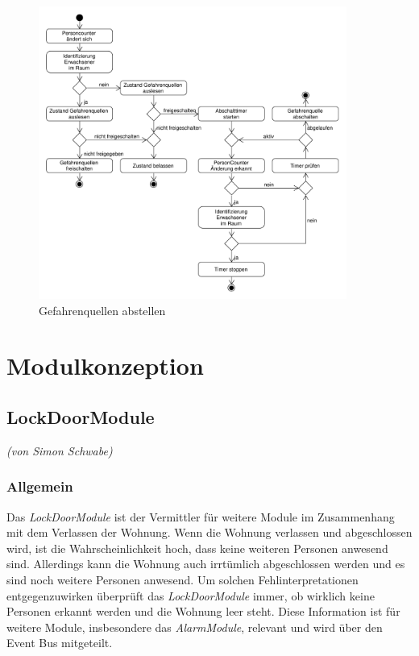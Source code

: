\newpage

\begin{figure}[h!]
	\centering
	\includegraphics[width=0.9\textwidth]{img/Szenarien/GefahrenquellenAbstellen.pdf}
	\caption{Gefahrenquellen abstellen}
	\label{fig:szenarienGefahrenquellenAbstellen}
\end{figure}


\newpage
\section{Modulkonzeption}
\label{sec:modulkonzepte}

\subsection{LockDoorModule}
\emph{(von Simon Schwabe)}

\subsubsection{Allgemein}
Das \emph{LockDoorModule} ist der Vermittler für weitere Module im Zusammenhang mit dem Verlassen der Wohnung. Wenn die Wohnung verlassen und abgeschlossen wird, ist die Wahrscheinlichkeit hoch, dass keine weiteren Personen anwesend sind. Allerdings kann die Wohnung auch irrtümlich abgeschlossen werden und es sind noch weitere Personen anwesend. Um solchen Fehlinterpretationen entgegenzuwirken überprüft das \emph{LockDoorModule} immer, ob wirklich keine Personen erkannt werden und die Wohnung leer steht. Diese Information ist für weitere Module, insbesondere das \emph{AlarmModule}, relevant und wird über den Event Bus mitgeteilt.

